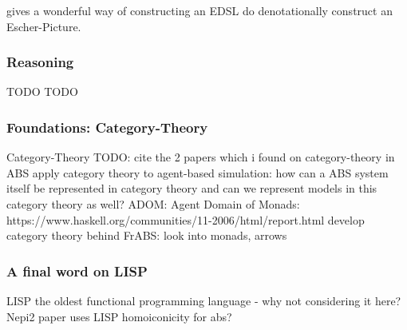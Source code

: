 \cite{henderson_functional_1982} gives a wonderful way of constructing an EDSL do denotationally construct an Escher-Picture.

\subsubsection{Reasoning}
TODO \cite{hutton_programming_2007}
TODO \cite{claessen_quickcheck:_2000}

\subsubsection{Foundations: Category-Theory}
Category-Theory \cite{Pierce1991} \cite{spivak_category_2014}
TODO: cite the 2 papers which i found on category-theory in ABS
apply category theory to agent-based simulation: how can a ABS system itself be represented in category theory and can we represent models in this category theory as well?
ADOM: Agent Domain of Monads: https://www.haskell.org/communities/11-2006/html/report.html
develop category theory behind FrABS: look into monads, arrows

\subsubsection{A final word on LISP}
LISP the oldest functional programming language - why not considering it here?
Nepi2 paper uses LISP
homoiconicity for abs?